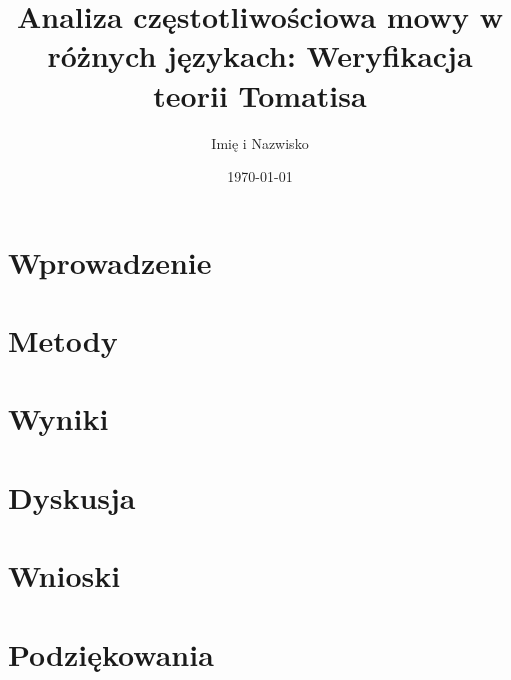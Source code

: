 \documentclass[a4paper,12pt]{article}
\title{Analiza częstotliwościowa mowy w różnych językach: Weryfikacja teorii Tomatisa}
\author{Imię i Nazwisko}
\date{\today}
\begin{document}
\maketitle

\begin{abstract}
    
\end{abstract}

\tableofcontents

\section{Wprowadzenie}


\section{Metody}


\section{Wyniki}


\section{Dyskusja}


\section{Wnioski}


\section*{Podziękowania}




\end{document}
